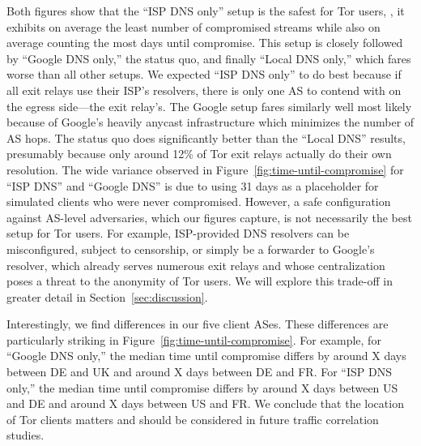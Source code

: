 Both figures show that the ``ISP DNS only'' setup is the safest for Tor users,
\ie, it exhibits on average the least number of compromised streams while also
on average counting the most days until compromise.  This setup is closely
followed by ``Google DNS only,'' the status quo, and finally ``Local DNS only,''
which fares worse than all other setups.  We expected ``ISP DNS only'' to do
best because if all exit relays use their ISP's resolvers, there is only one AS
to contend with on the egress side---the exit relay's.  The Google setup fares
similarly well most likely because of Google's heavily anycast infrastructure
which minimizes the number of AS hops.  The status quo does significantly better
than the ``Local DNS'' results, presumably because only around 12\% of Tor exit
relays actually do their own resolution.  The wide variance observed in
Figure~\ref{fig:time-until-compromise} for ``ISP DNS'' and ``Google DNS'' is due
to using 31 days as a placeholder for simulated clients who were never
compromised.  However, a safe configuration against AS-level adversaries, which
our figures capture, is not necessarily the best setup for Tor users.  For
example, ISP-provided DNS resolvers can be misconfigured, subject to censorship,
or simply be a forwarder to Google's resolver, which already serves numerous
exit relays and whose centralization poses a threat to the anonymity of Tor
users.  We will explore this trade-off in greater detail in
Section~\ref{sec:discussion}.

Interestingly, we find differences in our five client ASes.  These differences
are particularly striking in Figure~\ref{fig:time-until-compromise}.  %
For example, for ``Google DNS only,'' the median time until compromise 
differs by around X days between DE and UK and around X days between 
DE and FR. For ``ISP DNS only,'' the median time until compromise differs by 
around X days between US and DE and around X days between US and FR.  
We conclude that the location of Tor clients matters and should be
considered in future traffic correlation studies.
